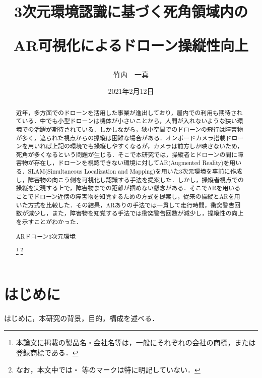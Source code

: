 \documentclass
[a4paper,11pt]{jreport}
\title
{3次元環境認識に基づく死角領域内の\par AR可視化によるドローン操縦性向上}
\author
{竹内　一真}
\date
{2021年2月12日}
\begin{document}
\maketitle
\begin{abstract}

近年，多方面でのドローンを活用した事業が進出しており，屋内での利用も期待されている．中でも小型ドローンは機体が小さいことから，人間が入れないような狭い環境での活躍が期待されている．しかしながら，狭小空間でのドローンの飛行は障害物が多く，遮られた視点からの操縦は困難な場合がある．オンボードカメラ搭載ドローンを用いれば上記の環境でも操縦しやすくなるが，カメラは前方しか映さないため，死角が多くなるという問題が生じる．そこで本研究では，操縦者とドローンの間に障害物が存在し，ドローンを視認できない環境に対してAR(Augmented Reality)を用いる．SLAM(Simultaneous Localization and Mapping)を用いた3次元環境を事前に作成し，障害物の向こう側を可視化し認識する手法を提案した．しかし，操縦者視点での操縦を実現する上で，障害物までの距離が掴めない懸念がある．そこでARを用いることでドローン近傍の障害物を知覚するための方式を提案し，従来の操縦とARを用いた方式を比較した．その結果，ARありの手法では一貫して走行時間，衝突警告回数が減少し，また，障害物を知覚する手法では衝突警告回数が減少し，操縦性の向上を示すことがわかった．

\addkeywords
{AR}{ドローン}{3次元環境}
\vspace{10.5cm}
\renewcommand{\thefootnote}{\fnsymbol{footnote}}

\footnote[0]{本論文に掲載の製品名・会社名等は，一般にそれぞれの会社の商標，または登録商標である．}
\footnote[0]{なお，本文中では\texttrademark ・ \textregistered 等のマークは特に明記していない．}
\end{abstract}



\setcounter{page}{0}

\tableofcontents
\newpage

\chapter{はじめに}
はじめに，本研究の背景，目的，構成を述べる．
\end{document}
